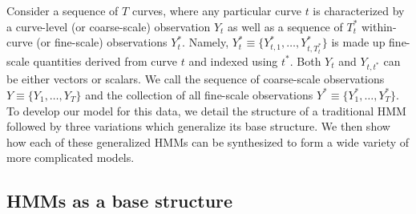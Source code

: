 
Consider a sequence of $T$ curves, where any particular curve $t$ is characterized by a curve-level (or coarse-scale) observation $Y_t$ as well as a sequence of $T^*_t$ within-curve (or fine-scale) observations $Y^*_{t}$. Namely, $Y^*_{t} \equiv \big\{Y^*_{t,1},\ldots,Y^*_{t,T^*_t}\big\}$ is made up fine-scale quantities derived from curve $t$ and indexed using $t^*$. Both $Y_t$ and $Y_{t,t^*}$ can be either vectors or scalars. We call the sequence of coarse-scale observations $Y \equiv \big\{Y_1, \ldots, Y_T\big\}$ and the collection of all fine-scale observations $Y^* \equiv \big\{Y^*_1,\ldots,Y^*_T \big\}$. To develop our model for this data, we detail the structure of a traditional HMM followed by three variations which generalize its base structure. We then show how each of these generalized HMMs can be synthesized to form a wide variety of more complicated models.


\subsection{HMMs as a base structure}
\label{subsec:HMM}

